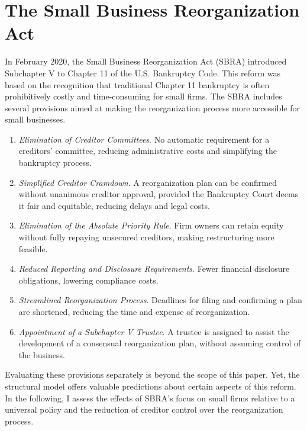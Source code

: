 \documentclass[12pt]{article}
\begin{document}
\section{The Small Business Reorganization Act}
In February 2020, the Small Business Reorganization Act (SBRA) introduced Subchapter V to Chapter 11 of the U.S. Bankruptcy Code. This reform was based on the recognition that traditional Chapter 11 bankruptcy is often prohibitively costly and time-consuming for small firms. The SBRA includes several provisions aimed at making the reorganization process more accessible for small businesses.
\begin{enumerate}
    \item \textit{Elimination of Creditor Committees}. No automatic requirement for a creditors' committee, reducing administrative costs and simplifying the bankruptcy process.   
    \item \textit{Simplified Creditor Cramdown}. A reorganization plan can be confirmed without unanimous creditor approval, provided the Bankruptcy Court deems it fair and equitable, reducing delays and legal costs.
    \item \textit{Elimination of the Absolute Priority Rule}. Firm owners can retain equity without fully repaying unsecured creditors, making restructuring more feasible.
    \item \textit{Reduced Reporting and Disclosure Requirements}. Fewer financial disclosure obligations, lowering compliance costs.
    \item \textit{Streamlined Reorganization Process}. Deadlines for filing and confirming a plan are shortened, reducing the time and expense of reorganization.
    \item \textit{Appointment of a Subchapter V Trustee}. A trustee is assigned to assist the development of a consensual reorganization plan, without assuming control of the business.
\end{enumerate}

\noindent Evaluating these provisions separately is beyond the scope of this paper. Yet, the structural model offers valuable predictions about certain aspects of this reform. In the following, I assess the effects of SBRA's focus on small firms relative to a universal policy and the reduction of creditor control over the reorganization process. \newpage
\end{document}
